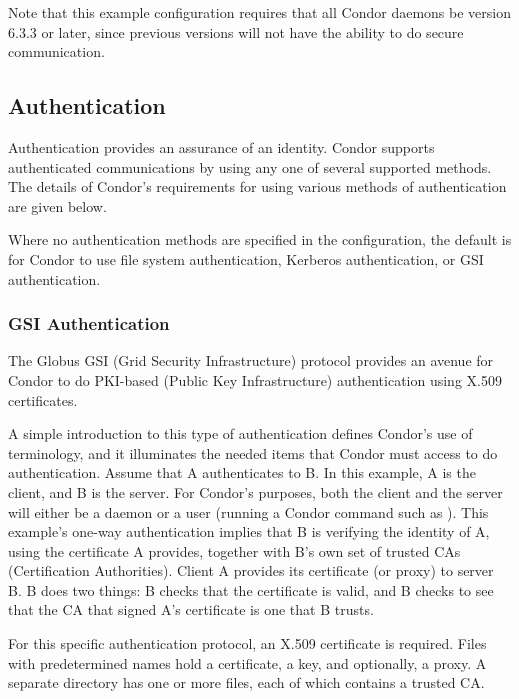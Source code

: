 Note that this example configuration requires that all Condor daemons be
version 6.3.3 or later, since previous versions will not have
the ability to do secure communication.

\subsection{\label{sec:Authentication}Authentication}
Authentication provides an assurance of an identity.
Condor supports authenticated communications by using any one
of several supported methods.
The details of Condor's requirements for using various methods
of authentication are given below.

Where no authentication methods are specified in the configuration,
the default is for Condor to use file system authentication,
Kerberos authentication, or GSI authentication.

\subsubsection{\label{sec:GSI-Authentication}GSI Authentication}
The Globus GSI (Grid Security Infrastructure) protocol provides
an avenue for Condor to do
PKI-based (Public Key Infrastructure) authentication using X.509 certificates.

A simple introduction to this type of authentication
defines Condor's use of terminology,
and it illuminates the needed items that Condor must access to
do authentication.
Assume that 
A authenticates to B.
In this example, A is the client, and B is the server.
For Condor's purposes, both the client and the server
will either be a daemon
or a user (running a Condor command such as ).
This example's one-way authentication implies that B
is verifying the identity of A,
using the certificate A provides,
together with B's own set of trusted CAs (Certification Authorities).
Client A provides its certificate (or proxy) to server B.
B does two things:
B checks that the certificate is valid,
and B checks to see that the CA that signed A's certificate
is one that B trusts.

For this specific authentication protocol,
an X.509 certificate is required.
Files with predetermined names hold a certificate,
a key, and optionally, a proxy.
A separate directory has one or more files, each of which contains
a trusted CA.

